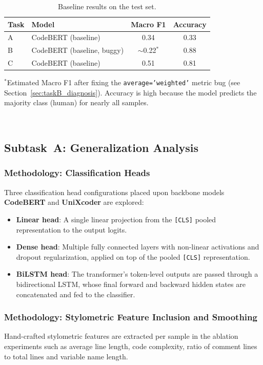 \documentclass[11pt]{article}
\begin{document}
\begin{table}[ht]
\centering
\small
\begin{tabularx}{\columnwidth}{@{}l X c c@{}}
\toprule
\textbf{Task} & \textbf{Model} & \textbf{Macro F1} & \textbf{Accuracy} \\ \midrule
A & CodeBERT (baseline) & 0.34 & 0.33 \\
B & CodeBERT (baseline, buggy) & $\sim$0.22$^*$ & 0.88 \\
C & CodeBERT (baseline) & 0.51 & 0.81 \\
\bottomrule
\end{tabularx}
\begin{minipage}{\columnwidth}
\small $^*$Estimated Macro F1 after fixing the \texttt{average='weighted'} metric bug (see Section~\ref{sec:taskB_diagnosis}). Accuracy is high because the model predicts the majority class (human) for nearly all samples.\\
\end{minipage}
\caption{Baseline results on the test set.}
\label{tab:baseline_results}
\end{table}
\
\subsection{Subtask~A: Generalization Analysis}

\subsubsection{Methodology: Classification Heads}
Three classification head configurations placed upon backbone models \textbf{CodeBERT} and \textbf{UniXcoder} are explored:

\begin{itemize}
    \item \textbf{Linear head}: A single linear projection from the \texttt{[CLS]}
    pooled representation to the output logits.
    \item \textbf{Dense head}: Multiple fully connected layers with non-linear
    activations and dropout regularization, applied on top of the pooled
    \texttt{[CLS]} representation.
    \item \textbf{BiLSTM head}: The transformer’s token-level outputs are passed through a bidirectional LSTM, whose final forward and backward hidden states are concatenated and fed to the classifier.
\end{itemize}
\subsubsection{Methodology: Stylometric Feature Inclusion and Smoothing}
Hand-crafted
stylometric features are extracted per sample in the ablation experiments such as average line length, code complexity, ratio of comment lines to total lines and variable name length.
\end{document}
